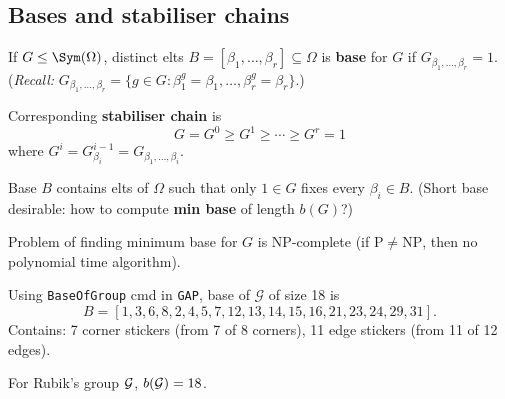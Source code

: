 \subsection{Bases and stabiliser chains}

\begin{slide}
    \begin{definition}
        \vspace{0pt}
        If $G \leq \Sym(\Omega)$, distinct elts $B = [\beta_1,\dotsc,\beta_r] \subseteq \Omega$ is \textbf{base} for $G$ if $G_{\beta_1,\dotsc,\beta_r} = 1$. (\textit{Recall:} $G_{\beta_1,\dotsc,\beta_r} = \{g \in G : \beta_1^g = \beta_1,\dotsc,\beta_r^g = \beta_r\}$.) \pause

        Corresponding \textbf{stabiliser chain} is
        \[G = G^0 \geq G^1 \geq \dotsb \geq G^r = 1\]
        where $G^i = G^{i-1}_{\beta_i} = G_{\beta_1,\dotsc,\beta_i}$.
    \end{definition} \pause

    Base $B$ contains elts of $\Omega$ such that only $1 \in G$ fixes every $\beta_i \in B$. (Short base desirable: how to compute \textbf{min base} of length $b(G)$?) \pause

    \begin{theorem}[Blaha, 1992]
        \vspace{0pt}
        Problem of finding minimum base for $G$ is NP-complete (if $\mathrm{P} \neq \mathrm{NP}$, then no polynomial time algorithm).
    \end{theorem}
\end{slide}

\begin{slide}
    \begin{example}
        \vspace{0pt}
        Using \texttt{BaseOfGroup} cmd in \texttt{GAP}, base of $\mathcal{G}$ of size 18 is
        $$B = [ 1, 3, 6, 8, 2, 4, 5, 7, 12, 13, 14, 15, 16, 21, 23, 24, 29, 31 ].$$ \pause
        Contains: 7 corner stickers (from 7 of 8 corners), 11 edge stickers (from 11 of 12 edges).
    \end{example} \pause

    \begin{theorem}
        \vspace{0pt}
        For Rubik's group $\mathcal{G}$, $b(\mathcal{G}) = 18$.
    \end{theorem}
\end{slide}

